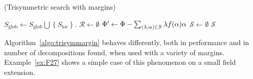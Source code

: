 \begin{algorithm}
  \caption{(Trisymmetric search with margins)}
  \label{algo:trisymmargin}
  \begin{algorithmic}[1]

      \State $S_\text{glob}\gets S_\text{glob}\bigcup \left\{S_\text{loc}\right\}$.
      \State $\mathcal R\gets\emptyset$
        \State {}
        \State $\Phi'\gets\Phi-\sum_{(\lambda, \alpha)\in
        S}\lambda f(\alpha)\alpha$
        \State {}
        \EndFor
      \EndIf
    \EndProcedure
    \State $\mathcal S\gets\emptyset$
    \State {}
    \State \Return $\mathcal S$
  \end{algorithmic}
\end{algorithm}
Algorithm~\ref{algo:trisymmargin} behaves differently, both in 
performance and in number of decompositions found, when used with a variety
of margins. Example~\ref{ex:F27} shows a simple case of this phenomenon on a
small field extension.


